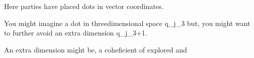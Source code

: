 \chaper{}

Here parties have placed dots in vector coordinates. 

You might imagine a dot in threedimensional space q_{j}_{3} 
but, you might want to further avoid an extra dimension q_{j}_{3+1}. 

An extra dimension might be, a coheficient of explored and 

